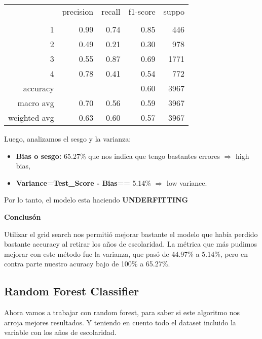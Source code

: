 \documentclass[a4paper]{article}
\begin{document}
            \begin{table}[H]
                \centering
                \begin{tabular}{rrrrr}
                    ~ & precision & recall & f1-score & suppo \\
                    & & & & \\
                    1 & 0.99 & 0.74 & 0.85 & 446 \\
                    2 & 0.49 & 0.21 & 0.30 & 978 \\
                    3 & 0.55 & 0.87 & 0.69 & 1771 \\
                    4 & 0.78 & 0.41 & 0.54 & 772 \\
                    accuracy & & & 0.60 & 3967 \\
                    macro avg & 0.70 & 0.56 & 0.59 & 3967 \\
                    weighted avg & 0.63 & 0.60 & 0.57 & 3967 \\
                \end{tabular}
            \end{table}

            Luego, analizamos el sesgo y la varianza:
            \begin{itemize}
                \item \textbf{Bias o sesgo:} 65.27\% que nos indica que tengo bastantes errores $\Rightarrow$ high bias,
                \item \textbf{Variance=Test\_Score - Bias==} 5.14\%  $\Rightarrow$ low variance.
            \end{itemize}

            Por lo tanto, el modelo esta haciendo \textbf{UNDERFITTING}

            \textbf{Conclusón}
            
            Utilizar el grid search nos permitió mejorar bastante el modelo que había perdido bastante accuracy al retirar los años de escolaridad. La métrica que más pudimos mejorar con este método fue la varianza, que pasó de 44.97\% a 5.14\%, pero en contra parte nuestro acuracy bajo de 100\% a 65.27\%.

    \subsection{Random Forest Classifier}
        
        Ahora vamos a trabajar con random forest, para saber si este algoritmo nos arroja mejores resultados. Y teniendo en cuento todo el dataset incluido la variable con los años de escolaridad. 
\end{document}
